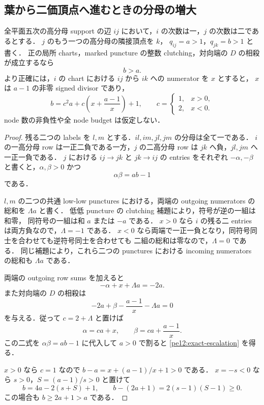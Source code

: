 
\subsection{葉から二価頂点へ進むときの分母の増大}
\label{pe12:section}

\begin{proposition}[葉に隣接する二価頂点]\label{pe12:leaf-escalation}
全平面五次の高分母 support の辺 $ij$ において，$i$ の次数は一，$j$ の次数は二であるとする．
$j$ のもう一つの高分母の隣接頂点を $k$，
$q_{ij}=a>1$，$q_{jk}=b>1$ と書く．
正の局所 charts，marked puncture の整数 clutching，対向端の $D$ の相殺が成立するなら
\[
 b>a.
\]
より正確には，$i$ の chart における $ij$ から $ik$ への numerator を $x$ とすると，
$x$ は $a-1$ の非零 signed divisor であり，
\begin{equation}\label{pe12:exact-escalation}
 b=c^2a+c\left(x+\frac{a-1}{x}\right)+1,
 \qquad
 c=\begin{cases}1,&x>0,\\2,&x<0.\end{cases}
\end{equation}
node 数の非負性や全 node budget は仮定しない．
\end{proposition}

\begin{proof}
残る二つの labels を $l,m$ とする．$il,im,jl,jm$ の分母は全て一である．
$i$ の一高分母 row は一正二負である一方，$j$ の二高分母 row は
$jk$ へ負，$jl,jm$ へ一正一負である．
$j$ における $ij\to jk$ と $jk\to ij$ の entries をそれぞれ
$-\alpha,-\beta$ と書くと，$\alpha,\beta>0$ かつ
\[
 \alpha\beta=ab-1
\]
である．

$l,m$ の二つの共通 low-low punctures における，両端の outgoing numerators の総和を $\Lambda a$ と書く．
低低 puncture の clutching 補題により，符号が逆の一組は和零，
同符号の一組は和 $a$ または $-a$ である．
$x>0$ なら $i$ の残る二 entries は両方負なので，$\Lambda=-1$ である．
$x<0$ なら両端で一正一負となり，同符号同士を合わせても逆符号同士を合わせても
二組の総和は零なので，$\Lambda=0$ である．
同じ補題により，これら二つの punctures における incoming numerators の総和も $\Lambda a$ である．

両端の outgoing row sums を加えると
\[
 -\alpha+x+\Lambda a=-2a.
\]
また対向端の $D$ の相殺は
\[
 -2a+\beta-\frac{a-1}{x}-\Lambda a=0
\]
を与える．従って $c=2+\Lambda$ と置けば
\[
 \alpha=ca+x,\qquad \beta=ca+\frac{a-1}{x}.
\]
この二式を $\alpha\beta=ab-1$ に代入して $a>0$ で割ると
\eqref{pe12:exact-escalation} を得る．

$x>0$ なら $c=1$ なので $b-a=x+(a-1)/x+1>0$ である．
$x=-s<0$ なら $s>0$，$S=(a-1)/s>0$ と置けて
\[
 b=4a-2(s+S)+1,
 \qquad b-(2a+1)=2(s-1)(S-1)\geq0.
\]
この場合も $b\geq2a+1>a$ である．
\end{proof}

